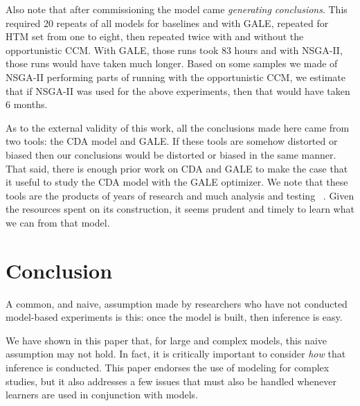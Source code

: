 \documentclass[journal]{IEEEtran}
\newcommand{\tion}[1]{\textsection\ref{sec:#1}}
\begin{document}
Also note that after commissioning the model came {\em generating conclusions}.
This required 20 repeats of all models for baselines and with GALE, repeated for HTM set from one to eight, then repeated twice
with and without the opportunistic CCM.
With GALE, those runs took 83 hours and with NSGA-II, those runs would have taken much longer.
Based on some samples we made of NSGA-II performing parts of running with the opportunistic CCM, we estimate that if NSGA-II was used for the above experiments, then that would have taken 6 months.


As to the external validity of this work,
all the conclusions made here came from two tools: the CDA model and GALE. 
If these tools are somehow distorted or biased then our conclusions would be distorted or biased in the same manner.
That said,
there is enough  prior work on CDA and GALE  to make the case that it useful to study the CDA model with the GALE optimizer.
We note that these tools are the products of years of research and much analysis and testing ~\cite{Kim2011,Pritchett2011,Feigh2012,Kim2013,Pritchett2013,Pritchett2014, Feigh 2014,krall14aaai,krallphd,galepaper}. 
Given the resources spent on its construction, it seems prudent and timely to learn what we can from that model.





\section{Conclusion}

A common, and naive, assumption made by researchers who have not conducted model-based experiments is this: once the model is built, then inference is easy.

We have shown in this paper that, for large and complex models, this naive assumption may not hold.
In fact, it is critically important to consider {\em how} that inference is conducted.
This paper endorses the use of modeling for complex studies, but it also addresses a few issues that must also be handled whenever learners are used in conjunction with models.  
\end{document}
